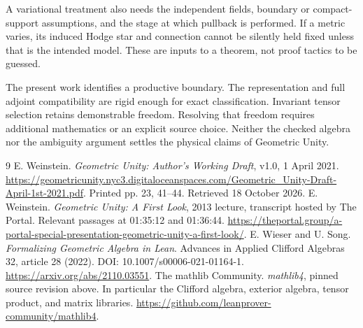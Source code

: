 \documentclass[11pt]{article}
\begin{document}
A variational treatment also needs the independent fields, boundary or compact-support assumptions, and the stage at which pullback is performed. If a metric varies, its induced Hodge star and connection cannot be silently held fixed unless that is the intended model. These are inputs to a theorem, not proof tactics to be guessed.

The present work identifies a productive boundary. The representation and full adjoint compatibility are rigid enough for exact classification. Invariant tensor selection retains demonstrable freedom. Resolving that freedom requires additional mathematics or an explicit source choice. Neither the checked algebra nor the ambiguity argument settles the physical claims of Geometric Unity.

\begin{thebibliography}{9}
 E. Weinstein. \emph{Geometric Unity: Author's Working Draft}, v1.0, 1 April 2021. \url{https://geometricunity.nyc3.digitaloceanspaces.com/Geometric_Unity-Draft-April-1st-2021.pdf}. Printed pp. 23, 41--44. Retrieved 18 October 2026.
 E. Weinstein. \emph{Geometric Unity: A First Look}, 2013 lecture, transcript hosted by The Portal. Relevant passages at 01:35:12 and 01:36:44. \url{https://theportal.group/a-portal-special-presentation-geometric-unity-a-first-look/}.
 E. Wieser and U. Song. \emph{Formalizing Geometric Algebra in Lean}. Advances in Applied Clifford Algebras 32, article 28 (2022). DOI: 10.1007/s00006-021-01164-1. \url{https://arxiv.org/abs/2110.03551}.
 The mathlib Community. \emph{mathlib4}, pinned source revision above. In particular the Clifford algebra, exterior algebra, tensor product, and matrix libraries. \url{https://github.com/leanprover-community/mathlib4}.
\end{thebibliography}
\end{document}
